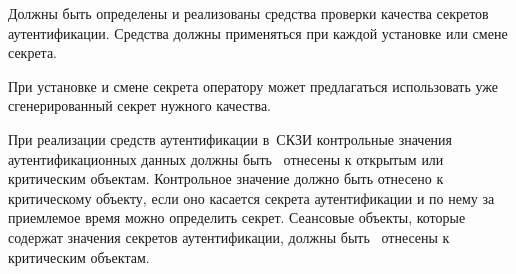 \label{R.IA.PwdSet}
Должны быть определены и реализованы средства проверки качества секретов
аутентификации. Средства должны применяться при каждой установке или смене
секрета.

\begin{note}
При установке и смене секрета оператору может предлагаться использовать
уже сгенерированный секрет нужного качества.
\end{note}

\label{R.IA.AuthData}
При реализации средств аутентификации в~СКЗИ контрольные значения
аутентификационных данных должны быть~ отнесены к открытым
или критическим объектам.
%
Контрольное значение должно быть отнесено к критическому объекту, 
если оно касается секрета аутентификации и по нему за приемлемое
время можно определить секрет.
%
Сеансовые объекты, которые содержат значения секретов аутентификации,
должны быть~ отнесены к критическим объектам.

